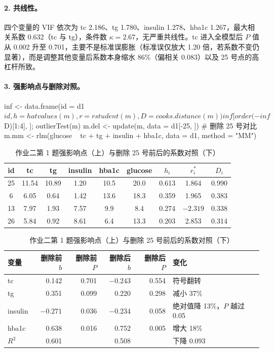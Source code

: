 \paragraph{2. 共线性。}四个变量的 VIF 依次为 tc 2.186、tg 1.780、insulin 1.278、hba1c 1.267，最大相关系数 0.632（tc 与 tg），条件数 $\kappa=2.67$，无严重共线性。tc 进入全模型后 $P$ 值从 0.002 升至 0.701，主要不是标准误膨胀（标准误仅放大 1.20 倍，若系数不变仍显著），而是调整其他变量后系数本身缩水 86\%（偏相关 0.083）以及 25 号点的高杠杆所致。

\paragraph{3. 强影响点与删除对照。}
\begin{RCode}
inf <- data.frame(id = d1$id, h = hatvalues(m), r = rstudent(m), D = cooks.distance(m))
inf[order(-inf$D)[1:4], ]; outlierTest(m)
m.del <- update(m, data = d1[-25, ])             # 删除 25 号对比
m.mm  <- rlm(glucose ~ tc + tg + insulin + hba1c, data = d1, method = "MM")
\end{RCode}

\begin{table}[htbp]
\centering\small
\caption{作业二第 1 题强影响点（上）与删除 25 号前后的系数对照（下）}
\begin{tabular}{@{}ccccccccc@{}}
\toprule
id & tc & tg & insulin & hba1c & glucose & $h_i$ & $r_i^*$ & $D_i$\\
\midrule
25 & 11.54 & 10.89 & 1.20 & 10.5 & 20.0 & 0.613 & 1.864  & 0.990\\
6  & 6.05  & 0.64  & 1.42 & 13.6 & 18.3 & 0.359 & 1.965  & 0.383\\
13 & 7.97  & 1.93  & 7.57 & 9.9  & 8.4  & 0.274 & $-2.319$ & 0.338\\
26 & 5.84  & 0.92  & 8.61 & 6.4  & 13.3 & 0.203 & 2.853  & 0.314\\
\bottomrule
\end{tabular}

\vspace{0.8em}
\begin{tabular}{@{}lrrrrl@{}}
\toprule
变量 & 删除前 $b$ & 删除前 $P$ & 删除后 $b$ & 删除后 $P$ & 变化\\
\midrule
tc      & 0.142  & 0.701 & $-0.243$ & 0.554 & 符号翻转\\
tg      & 0.351  & 0.099 & 0.220  & 0.298 & 减小 37\%\\
insulin & $-0.271$ & 0.036 & $-0.234$ & 0.058 & 绝对值降 13\%，$P$ 越过 0.05\\
hba1c   & 0.638  & 0.016 & 0.752  & 0.005 & 增大 18\%\\
\midrule
$R^2$   & 0.601  &       & 0.508  &       & 下降 0.093\\
\bottomrule
\end{tabular}
\end{table}

